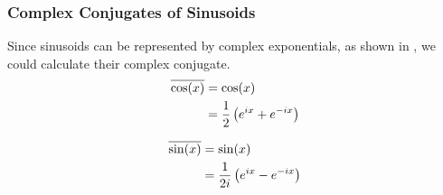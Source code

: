 \subsubsection{Complex Conjugates of Sinusoids}\label{subsubsec:Sinusoid_Complex_Conjugates}
Since sinusoids can be represented by complex exponentials, as shown in , we could calculate their complex conjugate.
\begin{equation}\label{eq:Sinusoid_Complex_Conjugate-Cosine}
  \begin{aligned}
    \overline{\cos(x)} &= \cos(x) \\
    &= \frac{1}{2} \left( e^{ix} + e^{-ix} \right) \\
  \end{aligned}
\end{equation}

\begin{equation}\label{eq:Sinusoid_Complex_Conjugate-Sine}
  \begin{aligned}
    \overline{\sin(x)} &= \sin(x) \\
    &= \frac{1}{2i} \left( e^{ix} - e^{-ix} \right) \\
  \end{aligned}
\end{equation}

